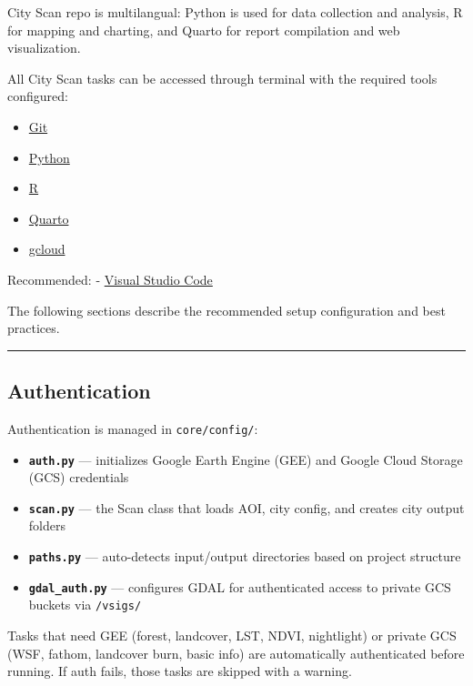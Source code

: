 \documentclass[
  letterpaper,
  DIV=11,
  numbers=noendperiod]{scrreprt}
\providecommand{\tightlist}{%
  \setlength{\itemsep}{0pt}\setlength{\parskip}{0pt}}
\begin{document}
City Scan repo is multilangual: Python is used for data collection and
analysis, R for mapping and charting, and Quarto for report compilation
and web visualization.

All City Scan tasks can be accessed through terminal with the required
tools configured:

\begin{itemize}
\tightlist
\item
  \hyperref[git]{Git}
\item
  \hyperref[python]{Python}
\item
  \hyperref[r]{R}
\item
  \hyperref[quarto]{Quarto}
\item
  \hyperref[gcloud]{gcloud}
\end{itemize}

Recommended: - \hyperref[vs-code]{Visual Studio Code}

The following sections describe the recommended setup configuration and
best practices.

\begin{center}\rule{0.5\linewidth}{0.5pt}\end{center}

\subsection{Authentication}\label{authentication}

Authentication is managed in \texttt{core/config/}:

\begin{itemize}
\tightlist
\item
  \textbf{\texttt{auth.py}} --- initializes Google Earth Engine (GEE)
  and Google Cloud Storage (GCS) credentials
\item
  \textbf{\texttt{scan.py}} --- the Scan class that loads AOI, city
  config, and creates city output folders
\item
  \textbf{\texttt{paths.py}} --- auto-detects input/output directories
  based on project structure
\item
  \textbf{\texttt{gdal\_auth.py}} --- configures GDAL for authenticated
  access to private GCS buckets via \texttt{/vsigs/}
\end{itemize}

Tasks that need GEE (forest, landcover, LST, NDVI, nightlight) or
private GCS (WSF, fathom, landcover burn, basic info) are automatically
authenticated before running. If auth fails, those tasks are skipped
with a warning.
\end{document}
